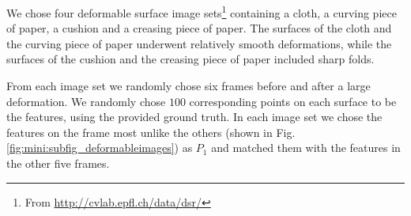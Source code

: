 We chose four deformable surface image sets\footnote{From \url{http://cvlab.epfl.ch/data/dsr/}} containing a cloth, a curving piece of paper, a cushion and a creasing piece of paper. The surfaces of the cloth and the curving piece of paper underwent relatively smooth deformations, while the surfaces of the cushion and the creasing piece of paper included sharp folds.

From each image set we randomly chose six frames before and after a large deformation. We randomly chose $100$ corresponding points on each surface to be the features, using the provided ground truth.
In each image set we chose the features on the frame most unlike the others  (shown in Fig.\ref{fig:mini:subfig_deformableimages}) as $P_1$ and matched them with the features in the other five frames.
